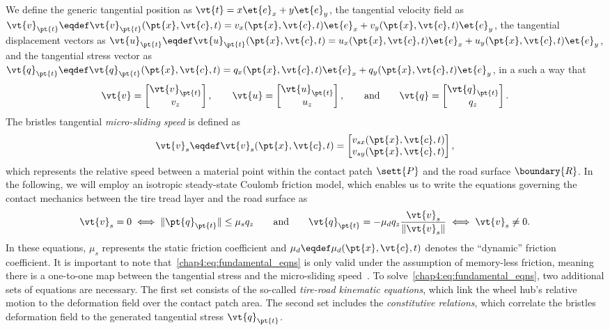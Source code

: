 We define the generic tangential position as $\vt{t} = x\et{e}_x + y\et{e}_y$, the tangential velocity field as $\vt{v}_{\pt{t}} \eqdef \vt{v}_{\pt{t}}(\pt{x}, \vt{c}, t) = v_x(\pt{x}, \vt{c}, t)\et{e}_x + v_y(\pt{x},\vt{c},t)\et{e}_y$, the tangential displacement vectors as $\vt{u}_{\pt{t}} \eqdef \vt{u}_{\pt{t}}(\pt{x},\vt{c},t) = u_x(\pt{x},\vt{c},t)\et{e}_x + u_y(\pt{x},\vt{c},t)\et{e}_y$, and the tangential stress vector as $\vt{q}_{\pt{t}} \eqdef \vt{q}_{\pt{t}}(\pt{x},\vt{c},t) = q_x(\pt{x},\vt{c},t)\et{e}_x + q_y(\pt{x},\vt{c},t)\et{e}_y$, in a such a way that
%
\begin{equation}
  \vt{v} =
  \begin{bmatrix}
    \vt{v}_{\pt{t}} \\
    v_z
  \end{bmatrix}, \qquad
  \vt{u} =
  \begin{bmatrix}
    \vt{u}_{\pt{t}} \\
    u_z
  \end{bmatrix}, \qquad \text{and} \qquad
  \vt{q} =
  \begin{bmatrix}
    \vt{q}_{\pt{t}} \\
    q_z
  \end{bmatrix}.
  \label{chap4:eq:ut}
\end{equation}
%
The bristles tangential \emph{micro-sliding speed} is defined as
%
\begin{equation}
  \vt{v}_s \eqdef \vt{v}_s(\pt{x},\vt{c},t) =
  \begin{bmatrix}
    v_{sx}(\pt{x},\vt{c},t) \\
    v_{sy}(\pt{x},\vt{c},t)
  \end{bmatrix},
\end{equation}
%
which represents the relative speed between a material point within the contact patch $\sett{P}$ and the road surface $\boundary{R}$. In the following, we will employ an isotropic steady-state Coulomb friction model, which enables us to write the equations governing the contact mechanics between the tire tread layer and the road surface as
%
\begin{equation}
  \vt{v}_s = 0 \iff \|\pt{q}_{\pt{t}}\| \leq \mu_s q_z
  \qquad \text{and} \qquad
  \vt{q}_{\pt{t}} = -\mu_d q_z \dfrac{\vt{v}_s}{\|\vt{v}_s\|}
  \iff \vt{v}_s \neq 0.
  \label{chap4:eq:fundamental_eqns}
\end{equation}
%
In these equations, $\mu_s$ represents the static friction coefficient and $\mu_d \eqdef \mu_d(\pt{x}, \vt{c}, t)$ denotes the ``dynamic'' friction coefficient. It is important to note that~\eqref{chap4:eq:fundamental_eqns} is only valid under the assumption of memory-less friction, meaning there is a one-to-one map between the tangential stress and the micro-sliding speed~\cite{canudasdewit2003dynamic}. To solve~\eqref{chap4:eq:fundamental_eqns}, two additional sets of equations are necessary. The first set consists of the so-called \emph{tire-road kinematic equations}, which link the wheel hub's relative motion to the deformation field over the contact patch area. The second set includes the \emph{constitutive relations}, which correlate the bristles deformation field to the generated tangential stress $\vt{q}_{\pt{t}}$.

